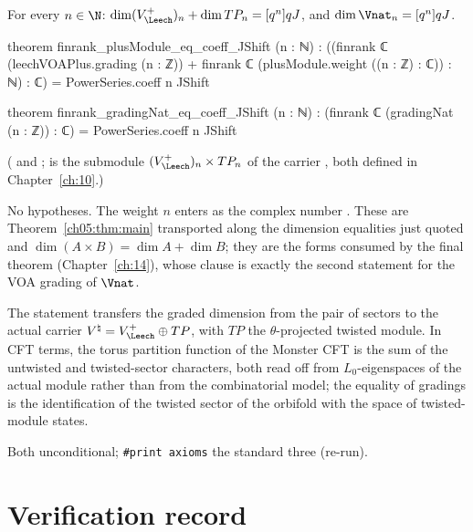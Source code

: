 \begin{theorem}\label{ch05:thm:carrier}
For every $n\in\N$: $\dim(V_\Leech^+)_n + \dim TP_n = [q^n]qJ$, and $\dim\Vnat_n = [q^n]qJ$.
\end{theorem}
\begin{leancode}
theorem finrank_plusModule_eq_coeff_JShift (n : ℕ) :
    ((finrank ℂ (leechVOAPlus.grading (n : ℤ))
      + finrank ℂ (plusModule.weight ((n : ℤ) : ℂ)) : ℕ) : ℂ)
      = PowerSeries.coeff n JShift

theorem finrank_gradingNat_eq_coeff_JShift (n : ℕ) :
    (finrank ℂ (gradingNat (n : ℤ)) : ℂ) = PowerSeries.coeff n JShift
\end{leancode}
( and ;  is the
submodule $(V_\Leech^+)_n\times TP_n$ of the carrier , both defined in Chapter~\ref{ch:10}.)
\begin{dictionary}
No hypotheses. The weight $n$ enters  as the complex number . These are Theorem~\ref{ch05:thm:main} transported along the dimension equalities just quoted and
$\dim(A\times B) = \dim A + \dim B$; they are the forms consumed by the final theorem
 (Chapter~\ref{ch:14}), whose clause
 is exactly the
second statement for the VOA grading of $\Vnat$.
\end{dictionary}

\begin{physics}
The statement transfers the graded dimension from the pair of sectors to the actual carrier $V^\natural=V_\Leech^+\oplus TP$, with $TP$ the $\theta$-projected twisted module. In CFT terms, the torus partition function of the Monster CFT is the sum of the untwisted and twisted-sector characters, both read off from $L_0$-eigenspaces of the actual module rather than from the combinatorial model; the equality of gradings is the identification of the twisted sector of the orbifold with the space of twisted-module states.
\end{physics}
\begin{status}
Both unconditional; \texttt{\#print axioms} the standard three (re-run).
\end{status}

\section{Verification record}\label{ch05:sec:verification}

